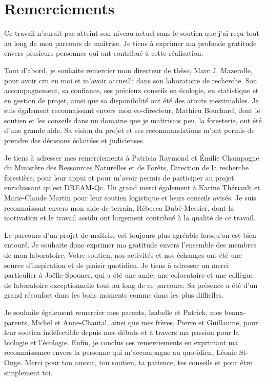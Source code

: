 \chapter*{Remerciements}        %
\label{chap-remerciements}      %


 Ce travail n'aurait pas atteint son niveau actuel sans le soutien que j'ai reçu tout au long de mon parcours de maîtrise. 
 Je tiens à exprimer ma profonde gratitude envers plusieurs personnes qui ont contribué à cette réalisation.

 Tout d'abord, je souhaite remercier mon directeur de thèse, Marc J. Mazerolle, pour avoir cru en moi et m'avoir accueilli dans son laboratoire de recherche. 
 Son accompagnement, sa confiance, ses précieux conseils en écologie, en statistique et en gestion de projet, ainsi que sa disponibilité ont été des atouts inestimables. 
 Je suis également reconnaissant envers mon co-directeur, Mathieu Bouchard, dont le soutien et les conseils dans un domaine que je maîtrisais peu, la foresterie, ont été d'une grande aide. 
 Sa vision du projet et ses recommandations m'ont permis de prendre des décisions éclairées et judicieuses.

 Je tiens à adresser mes remerciements à Patricia Raymond et Émilie Champagne du Ministère des Ressources Naturelles et de Forêts, Direction de la recherche forestière, 
 pour leur appui et pour m'avoir permis de participer au projet enrichissant qu'est DREAM-Qc. 
 Un grand merci également à Karine Thériault et Marie-Claude Martin pour leur soutien logistique et leurs conseils avisés. 
 Je suis reconnaissant envers mon aide de terrain, Rébecca Dubé-Messier, dont la motivation et le travail assidu ont largement contribué à la qualité de ce travail.

 Le parcours d'un projet de maîtrise est toujours plus agréable lorsqu'on est bien entouré. 
 Je souhaite donc exprimer ma gratitude envers l'ensemble des membres de mon laboratoire. 
 Votre soutien, nos activités et nos échanges ont été une source d'inspiration et de plaisir quotidien. 
 Je tiens à adresser un merci particulier à Joëlle Spooner, qui a été une amie, une colocataire et une collègue de laboratoire exceptionnelle tout au long de ce parcours. 
 Sa présence a été d'un grand réconfort dans les bons moments comme dans les plus difficiles.

 Je souhaite également remercier mes parents, Isabelle et Patrick, mes beaux-parents, Michel et Anne-Chantal, ainsi que mes frères, Pierre et Guillaume, pour leur soutien indéfectible depuis mes débuts et à travers ma passion pour la biologie et l'écologie. 
 Enfin, je conclus ces remerciements en exprimant ma reconnaissance envers la personne qui m'accompagne au quotidien, Léonie St-Onge. 
 Merci pour ton amour, ton soutien, ta patience, tes conseils et pour être simplement toi.


